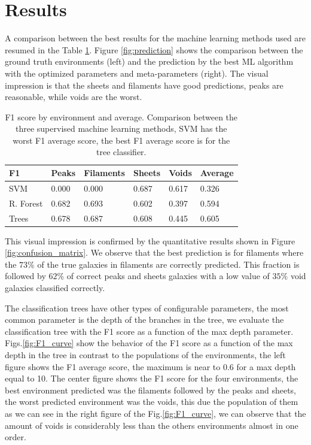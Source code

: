 \documentclass[usenatbib]{mnras}
\begin{document}
\section{Results}\label{sec:results}

A comparison between the best results for the machine learning methods used are resumed in the Table \ref{tab:methods}. Figure \ref{fig:prediction} shows the comparison between the ground truth environments (left) and the prediction by the best ML algorithm with the optimized parameters and meta-parameters (right). 
The visual impression is that the sheets and filaments have good predictions, 
peaks are reasonable, while voids are the worst.

\begin{table}
\centering
\begin{tabular}{l|l|l|l|l|l|}
 F1 & Peaks & Filaments & Sheets & Voids & Average \\ \hline
\multicolumn{1}{|l|}{SVM} & 0.000 & 0.000 & 0.687 & 0.617 & 0.326 \\ \hline
\multicolumn{1}{|l|}{R. Forest} & 0.682 & 0.693 & 0.602 & 0.397 & 0.594 \\ \hline
\multicolumn{1}{|l|}{Trees} & 0.678 & 0.687 & 0.608 & 0.445 & 0.605 \\ \hline
\end{tabular}
\caption{F1 score by environment and average. Comparison between the three supervised machine learning methods, SVM has the worst F1 average score, the best F1 average score is for the tree classifier.}
\label{tab:methods}
\end{table}

This visual impression is confirmed by the quantitative results shown in Figure \ref{fig:confusion_matrix}.
We observe that the best prediction is for filaments where the $73\%$ of the true galaxies in filaments are correctly predicted. 
This fraction is followed by $62\%$ of correct peaks and sheets galaxies with
a low value of $35\%$ void galaxies classified correctly.


The classification trees have other types of configurable parameters, the most common parameter is the depth of the branches in the tree, we evaluate the classification tree with the F1 score as a function of the max depth parameter. 
Figs.\ref{fig:F1_curve} show the behavior of the F1 score as a function of the max depth in the tree in contrast to the populations of the environments, the left figure shows the F1 average score, the maximum is near to 0.6 for a max depth equal to 10. 
The center figure shows the F1 score for the four environments, the best environment predicted was the filaments followed by the peaks and sheets, the worst predicted environment was the voids, this due the population of them as we can see in the right figure of the Fig.\ref{fig:F1_curve}, we can observe that the amount of voids is considerably less than the others environments almost in one order.
\end{document}
